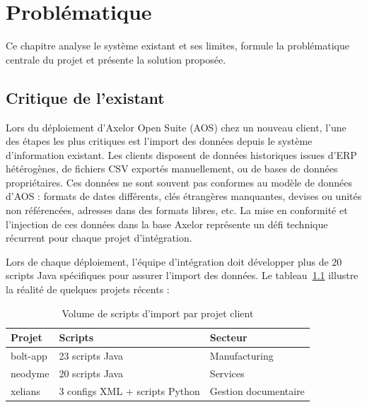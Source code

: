 \chapter{Problématique}
\label{chap:problematique}

Ce chapitre analyse le système existant et ses limites, formule la problématique centrale du projet et présente la solution proposée.

\section{Critique de l'existant}
\label{sec:critique-existant}

Lors du déploiement d'Axelor Open Suite (AOS) chez un nouveau client, l'une des étapes les plus critiques est l'import des données depuis le système d'information existant. Les clients disposent de données historiques issues d'ERP hétérogènes, de fichiers CSV exportés manuellement, ou de bases de données propriétaires. Ces données ne sont souvent pas conformes au modèle de données d'AOS : formats de dates différents, clés étrangères manquantes, devises ou unités non référencées, adresses dans des formats libres, etc. La mise en conformité et l'injection de ces données dans la base Axelor représente un défi technique récurrent pour chaque projet d'intégration.

Lors de chaque déploiement, l'équipe d'intégration doit développer plus de 20 scripts Java spécifiques pour assurer l'import des données. Le tableau~\ref{tab:projets-scripts} illustre la réalité de quelques projets récents :

\begin{table}[H]
    \centering
    \renewcommand{\arraystretch}{1.3}
    \begin{tabular}{p{3cm} p{4.5cm} p{5cm}}
        \toprule
        \rowcolor{gray!20}
        \textbf{Projet} & \textbf{Scripts} & \textbf{Secteur} \\
        \midrule
        \rowcolor{gray!5}
        bolt-app & 23 scripts Java & Manufacturing \\
        neodyme  & 20 scripts Java & Services \\
        \rowcolor{gray!5}
        xelians  & 3 configs XML + scripts Python & Gestion documentaire \\
        \bottomrule
    \end{tabular}
    \caption{Volume de scripts d'import par projet client}
    \label{tab:projets-scripts}
\end{table}

